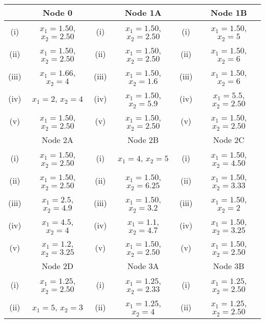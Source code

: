 \documentclass[a4paper,12pt]{article}
\begin{document}
	\large	
	\begin{tabular}{||c|c||c|c||c|c||}
		\hline  & Node 0 &   & Node 1A &  & Node 1B     \\  \hline
		\hline (i) & $x_1= 1.50$, $x_2= 2.50$ & (i) & $x_1= 1.50$, $x_2= 2.50$ &  (i)  & $x_1= 1.50$, $x_2 = 5$\\  \hline
		\hline (ii)  & $x_1= 1.50$, $x_2= 2.50$  &  (ii) & $x_1= 1.50$, $x_2= 2.50$ & (ii) & $x_1= 1.50$, $x_2 = 6 $ \\  \hline
		\hline (iii) & $x_1= 1.66$, $x_2 = 4$  & (iii) & $x_1= 1.50$, $x_2 = 1.6$ & (iii) & $x_1= 1.50$, $x_2 = 6$ \\  \hline
		\hline (iv)  & $x_1= 2$, $x_2 =4 $  &  (iv) & $x_1= 1.50$, $x_2 = 5.9 $ & (iv)  & $x_1= 5.5$, $x_2= 2.50$\\  \hline
		\hline (v) & $x_1= 1.50$, $x_2= 2.50$ & (v)  & $x_1= 1.50$, $x_2= 2.50$ & (v) & $x_1= 1.50$, $x_2= 2.50$\\  \hline
		\hline 
		\hline  & Node 2A &   & Node 2B &  & Node 2C  \\  \hline
		\hline (i) & $x_1= 1.50$, $x_2= 2.50$ & (i)  & $x_1= 4$, $x_2 = 5$  & (i)  & $x_1= 1.50$, $x_2 = 4.50$\\  \hline
		\hline (ii)  & $x_1= 1.50$, $x_2= 2.50$  &  (ii) & $x_1= 1.50$, $x_2 = 6.25$ & (ii) & $x_1= 1.50$, $x_2 = 3.33 $ \\  \hline
		\hline (iii) & $x_1= 2.5  $, $x_2 = 4.9 $  &  (iii) & $x_1= 1.50$, $x_2 = 3.2$ &  (iii) & $x_1= 1.50$, $x_2 = 2$ \\  \hline
		\hline (iv)  & $x_1= 4.5$, $x_2 = 4 $  & (iv) & $x_1= 1.1 $, $x_2 = 4.7 $ & (iv)  & $x_1= 1.50$, $x_2 = 3.25$\\  \hline
		\hline (v) & $x_1= 1.2 $, $x_2 = 3.25 $ & (v) & $x_1= 1.50$, $x_2= 2.50$  &(v) & $x_1= 1.50$, $x_2= 2.50$\\  \hline
		\hline 
		\hline  & Node 2D &   & Node 3A &  & Node 3B   \\  \hline
		\hline (i) & $x_1= 1.25$, $x_2= 2.50$ &  (i) & $x_1= 1.25$, $x_2 = 2.33$  & (i)  & $x_1= 1.25$, $x_2= 2.50$\\  \hline
		\hline (ii)  & $x_1= 5$, $x_2 = 3$  &  (ii) & $x_1= 1.25$, $x_2 = 4$ & (ii) & $x_1= 1.25$, $x_2= 2.50$ \\  \hline

\end{tabular}
\end{document}
